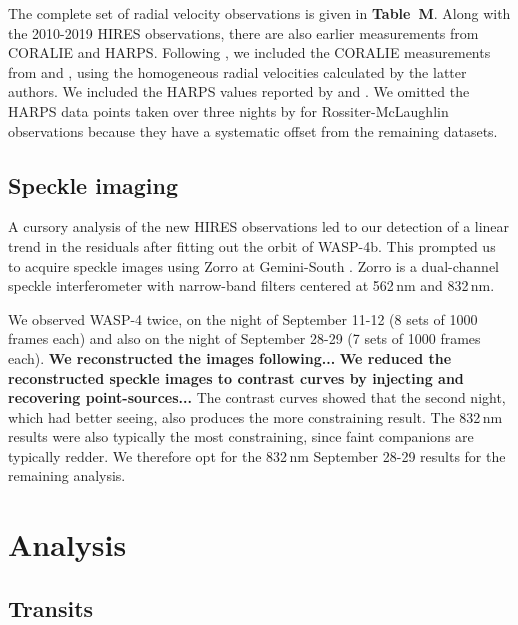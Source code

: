 \documentclass[12pt,twocolumn,tighten]{aastex62}
\begin{document}
The complete set of radial velocity observations is given in {\bf
Table~M}.  Along with the 2010-2019 HIRES observations, there are also
earlier measurements from CORALIE and HARPS.  Following
, we included the CORALIE measurements
from \citet{wilson_wasp-4b_2008} and \citet{triaud_spin-orbit_2010},
using the homogeneous radial velocities calculated by the latter
authors. We included the HARPS values reported by
\citet{pont_determining_2011} and \citet{husnoo_observational_2012}.
We omitted the HARPS data points taken over three nights by
\citet{triaud_spin-orbit_2010} for Rossiter-McLaughlin observations
because they have a systematic offset from the remaining datasets.

\subsection{Speckle imaging}

A cursory analysis of the new HIRES observations led to our detection
of a linear trend in the residuals after fitting out the orbit of
WASP-4b.  This prompted us to acquire speckle images using Zorro at
Gemini-South \citep[see][and the instrument
web-pages\footnote{\url{www.gemini.edu/sciops/instruments/alopeke-zorro/}}]{scott_nessi_2018}.
Zorro is a dual-channel speckle interferometer with narrow-band
filters centered at 562$\,$nm and 832$\,$nm.  

We observed WASP-4 twice, on the night of September 11-12 (8 sets of
1000 frames each) and also on the night of September 28-29 (7 sets of
1000 frames each).
{\bf We reconstructed the images following...}
{\bf We reduced the reconstructed speckle images to contrast curves by
injecting and recovering point-sources...}
The contrast curves showed that the second night, which had better
seeing, also produces the more constraining result.
The 832$\,$nm results were also typically the most constraining, since
faint companions are typically redder.
We therefore opt for the 832$\,$nm September 28-29 results for the
remaining analysis.



\section{Analysis}
\label{sec:analysis}

\subsection{Transits}
\label{sec:transit_analysis}
\end{document}
